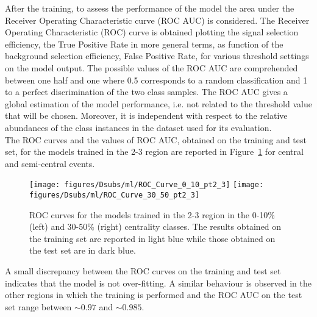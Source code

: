 After the training, to assess the performance of the model the area under the Receiver Operating Characteristic curve (ROC AUC) 
is considered. The Receiver Operating Characteristic (ROC) curve is obtained plotting the signal selection efficiency, the 
True Positive Rate in more general terms, as function of the background selection efficiency, False Positive Rate, for various 
threshold settings on the model output. The possible values of the ROC AUC are comprehended between one half and one where 0.5 corresponds 
to a random classification and 1 to a perfect discrimination of the two class samples. The ROC AUC gives a global estimation of the model 
performance, i.e. not related to the threshold value that will be chosen. Moreover, it is independent with respect to the
relative abundances of the class instances in the dataset used for its evaluation. \\
The ROC curves and the values of ROC AUC, obtained on the training and test set, for the models trained in the 2-3 \pt{} region are reported in Figure~\ref{fig:roc_pt2_3} 
for central and semi-central events.
\begin{figure}[htbp]
  \begin{center}
   \texttt{[image: figures/Dsubs/ml/ROC\_Curve\_0\_10\_pt2\_3]}
   \texttt{[image: figures/Dsubs/ml/ROC\_Curve\_30\_50\_pt2\_3]} 
  \caption{ROC curves for the models trained in the 2-3 \pt{} region in the 0-10\% (left) and 30-50\% (right) centrality classes. 
           The results obtained on the training set are reported in light blue while those obtained on the test set are in dark blue.}
  \label{fig:roc_pt2_3}
  \end{center}
\end{figure}
A small discrepancy between the ROC curves on the training and test set indicates that the model is not over-fitting. A similar behaviour 
is observed in the other \pt{} regions in which the training is performed and the ROC AUC on the test set range between \(\sim 0.97\) and \(\sim 0.985\).


